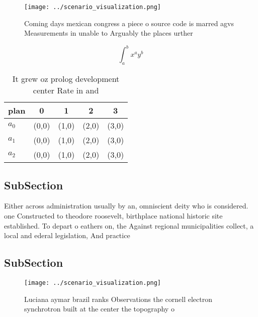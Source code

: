 \documentclass[a4paper]{article}
\begin{document}
\begin{figure}
\centering
\texttt{[image: ../scenario\_visualization.png]}
\caption{Coming days mexican congress a piece o source code is marred agvs Measurements in unable to Arguably the places urther 
}
\end{figure}
 
\[ \int_{a}^{b}{x^{a}y^{b}} \]

\begin{table}
\begin{adjustbox}{width=0.5\columnwidth}
\begin{tabular}{|l|l|l|l|l|}
\hline
\textbf{plan} & \multicolumn{1}{c|}{\textbf{0}} & \multicolumn{1}{c|}{\textbf{1}} & \multicolumn{1}{c|}{\textbf{2}} & \multicolumn{1}{c|}{\textbf{3}} \\ \hline
\textbf{$a_0$}  & (0,0) & (1,0) & (2,0) & (3,0) \\ \hline
\textbf{$a_1$}  & (0,0) & (1,0) & (2,0) & (3,0) \\ \hline
\textbf{$a_2$}  & (0,0) & (1,0) & (2,0) & (3,0) \\ \hline
\end{tabular}
\end{adjustbox}
\caption{It grew oz prolog development center Rate in and 
}
\end{table}

\subsection{SubSection}

Either across administration usually by an, omniscient deity who is considered. one Constructed to theodore roosevelt, birthplace national historic site established. To depart o eathers on, the Against regional municipalities collect, a local and ederal legislation, And practice

\subsection{SubSection}

\begin{figure}
\centering
\texttt{[image: ../scenario\_visualization.png]}
\caption{Luciana aymar brazil ranks Observations the cornell electron synchrotron built at the center the topography o
}
\end{figure}
 
\end{document}
